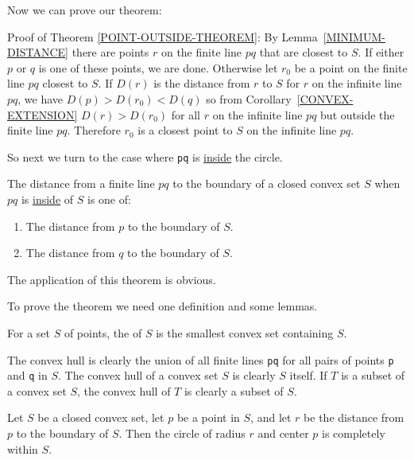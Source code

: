 \documentclass[12pt]{article}
\begin{document}
Now we can prove our theorem:

\begin{indpar}{0.2in}
Proof of Theorem \ref{POINT-OUTSIDE-THEOREM}:
By Lemma~\ref{MINIMUM-DISTANCE} there are points $r$ on the
finite line $pq$ that are closest to $S$.  If either $p$ or $q$ is
one of these points, we are done.  Otherwise
let $r_0$ be a point on the finite line $pq$ closest to $S$.
If $D(r)$ is the distance from $r$ to $S$ for $r$ on the infinite line $pq$,
we have $D(p)>D(r_0)<D(q)$ so from Corollary~\ref{CONVEX-EXTENSION}
$D(r)>D(r_0)$ for all $r$ on the infinite line $pq$ but outside the
finite line $pq$.  Therefore $r_0$ is a closest point to $S$ on the
infinite line $pq$.
\end{indpar}


So next we turn to the case where {\tt pq} is \underline{inside} the
circle.

\begin{theorem}\label{POINT-INSIDE-THEOREM}
The distance from a finite line $pq$ to the boundary of a
closed convex set $S$ when
$pq$ is \underline{inside} of $S$ is one of:
\begin{enumerate}
\item The distance from $p$ to the boundary of $S$.
\item The distance from $q$ to the boundary of $S$.
\end{enumerate}
\end{theorem}

The application of this theorem is obvious.

To prove the theorem we need one definition and some lemmas.

\begin{definition}
For a set $S$ of points, the  of $S$ is the
smallest convex set containing $S$.
\end{definition}

The convex hull is clearly the union of all finite lines {\tt pq} for
all pairs of points {\tt p} and {\tt q} in $S$.  The convex hull of
a convex set $S$ is clearly $S$ itself.
If $T$ is a subset of a convex set $S$,
the convex hull of $T$ is clearly a subset of $S$.

\begin{lemma}
Let $S$ be a closed convex set, let $p$ be a point in $S$, and
let $r$ be the distance from $p$ to the boundary of $S$.  Then
the circle of radius $r$ and center $p$ is completely within $S$.
\end{lemma}
\end{document}
